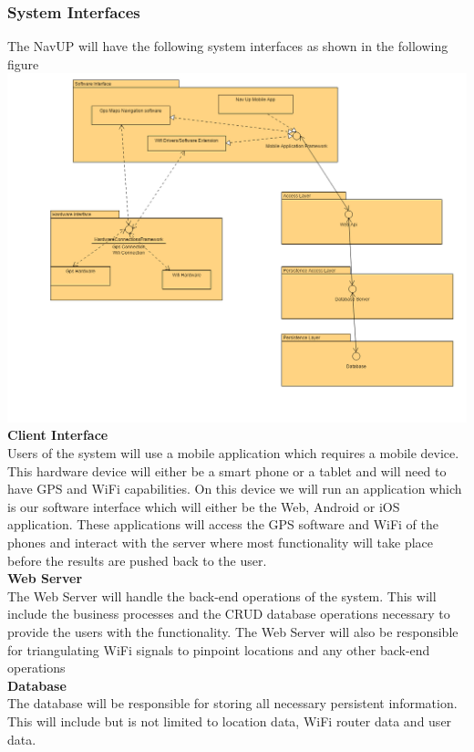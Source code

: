 \documentclass[a4paper,12pt]{article}
\begin{document}
\subsubsection{System Interfaces}
The NavUP will have the following system interfaces as shown in the following figure\\
\includegraphics[width=\textwidth]{images/system_interface.png}
\textbf {Client Interface}\\
Users of the system will use a mobile application which requires a mobile device. This hardware device will either be a smart phone or a tablet and will need to have GPS and WiFi capabilities. On this device we will run an application which is our software interface which will either be the Web, Android or iOS application. These applications will access the GPS software and WiFi of the phones and interact with the server where most functionality will take place before the results are pushed back to the user.\\
\textbf{Web Server}\\
The Web Server will handle the back-end operations of the system. This will include the business processes and the CRUD database operations necessary to provide the users with the functionality. The Web Server will also be responsible for triangulating WiFi signals to pinpoint locations and any other  back-end operations \\
\textbf{Database}\\
The database will be responsible for storing all necessary persistent information. This will include but is not limited to location data, WiFi router data and user data.
\end{document}
